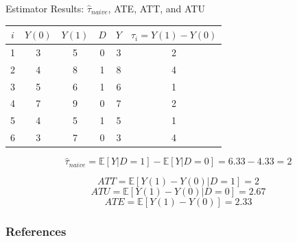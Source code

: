 \documentclass[xcolor=svgnames,t]{beamer}
\begin{document}
\begin{frame}{Estimator Results: \( \hat{\tau}_{naive} \), ATE, ATT, and ATU}

    \small{
   
    \centering
    \begin{table}[]
    \centering
    \begin{tabular}{|c|c|c|c|c|c|}
    \hline
    \( i \) & \( Y(0) \) & \( Y(1) \) & \( D \) & \( Y \) & \( \tau_i = Y(1) - Y(0) \) \\ \hline
    1 & 3  & 5  & 0 & 3 & 2 \\ \hline
    \rowcolor{blue!20} 2 & 4  & 8  & 1 & 8 & 4 \\ \hline
    \rowcolor{blue!20} 3 & 5  & 6  & 1 & 6 & 1 \\ \hline
    4 & 7  & 9  & 0 & 7 & 2 \\ \hline
    \rowcolor{blue!20} 5 & 4  & 5  & 1 & 5 & 1 \\ \hline
    6 & 3  & 7  & 0 & 3 & 4 \\ \hline
    \end{tabular}
    \end{table}
    
    \pause
    
      \[
    \hat{\tau}_{naive} = \mathbb{E}[Y | D = 1] - \mathbb{E}[Y | D = 0] = 6.33 - 4.33 = 2
    \]
    
    \pause
    
     \[
    ATT = \mathbb{E}[Y(1) - Y(0) | D = 1] = 2
    \]
    \pause
    \[
    ATU = \mathbb{E}[Y(1) - Y(0) | D = 0] = 2.67
    \]
    \pause
    \[
    ATE = \mathbb{E}[Y(1) - Y(0)] = 2.33
    \]
    
    }
    
    \end{frame}
    
    

\begin{frame} [allowframebreaks]
    \frametitle{References}
    
    
\end{frame}
\end{document}
